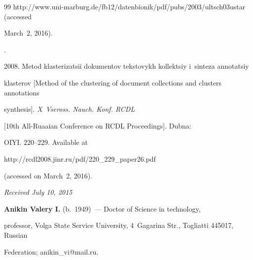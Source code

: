 {{\begin{thebibliography}{99}
{http://www.uni-marburg.de/fb12/datenbionik/pdf/pubs/2003/\linebreak ultsch03ustar} (accessed 


March~2, 2016).







. 


2008. Metod klas\-te\-ri\-zatsii dokumentov tekstovykh kollektsiy i~sinteza annotatsiy 


klas\-te\-rov [Method of the clustering of document collections and clusters annotations 


synthesis]. \textit{X~Vseross. Nauch. Konf. RCDL}


[10th All-Ruaaian Conference on RCDL Proceedings]. Dubna: 


OIYI. 220--229. Available at {\sf 


http://rcdl2008.jinr.ru/pdf/220\_229\_paper26.pdf} (accessed on March~2, 2016).


  \end{thebibliography}


} }








\vspace*{-1pt}





\hfill{\small\textit{Received July 10, 2015}}


  


  \Contr


  


  \noindent


  \textbf{Anikin Valery I.} (b.\ 1949)~--- Doctor of Science in technology, 


professor, Volga State Service University, 4~Gagarina Str., Togliatti 445017, Russian 


Federation; anikin\_vi@mail.ru.


  


  \vspace*{3pt}


  


  \noindent


